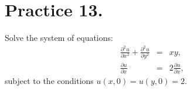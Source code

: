 \documentclass[a4paper,12pt]{article}
\begin{document}
%
%
%
%
%
%
%
\section*{Practice 13.}
Solve the system of equations: 
\begin{eqnarray}
\frac{\partial^2 u}{\partial x^2}+\frac{\partial^2 u}{\partial y^2} &=& xy,
\label{E:Pyth}\\
\frac{\partial u}{\partial x}&=&2\frac{\partial u}{\partial x},
\label{E:alpha}
\end{eqnarray}
subject to the conditions $u(x,0)=u(y,0)=2$.
\end{document}
